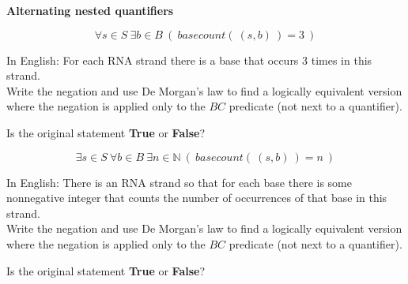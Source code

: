 
{\bf Alternating nested quantifiers}

$$\forall s \in S ~\exists b\in B ~(~basecount(~(s,b)~) = 3~)$$

In English: For each RNA strand there is a base that occurs 3 times in this strand.\\

Write the negation and use De Morgan's law to find a 
logically equivalent version where the negation is applied only to the 
$BC$ predicate (not next to a quantifier).

\vspace{60pt}


Is the original statement {\bf True} or {\bf False}?


\vfill


$$\exists s \in S ~\forall b \in B ~\exists n \in \mathbb{N} ~(~basecount(~(s,b)~) = n~)$$

In English: There is an RNA strand so that for each base there is some nonnegative
integer that counts the number of occurrences of that base in this strand.\\

Write the negation and use De Morgan's law to find a 
logically equivalent version where the negation is applied only to the 
$BC$ predicate (not next to a quantifier).

\vspace{60pt}


Is the original statement {\bf True} or {\bf False}?


\vfill

